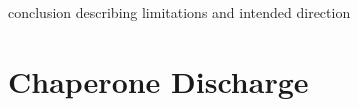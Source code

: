 \documentclass{sigplanconf}
\begin{document}







conclusion describing limitations and intended direction


\section{Chaperone Discharge}

\end{document}
